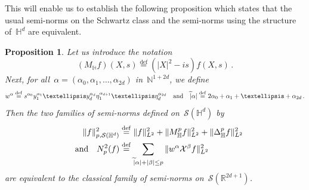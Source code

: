 \documentclass[11pt]{article}
\newtheorem{prop}[theo]{Proposition}
\theoremstyle{definition}
\numberwithin{equation}{section}
\numberwithin{figure}{section}
\numberwithin{table}{section}
\newcommand{\D}{\Delta}
\newcommand{\wt}{\widetilde}
\newcommand*\cS{\mathcal{S}}
\newcommand*\cX{\mathcal{X}}
\newcommand*\N{\mathbb{N}}
\newcommand*\R{\mathbb{R}}
\newcommand*\bbH{\mathbb{H}}
\newcommand{\andf}{\quad\hbox{and}\quad}
\newcommand*\eqdefa{\overset{\mathrm{def}}{=}}
\begin{document}
This will enable us to establish the following proposition which states that the usual semi-norms on the Schwartz class and the semi-norms using the structure of~$\bbH^d$ are equivalent.

\begin{prop}\label{p:schwartz}
Let us introduce the notation
\[
(M_\bbH f) (X,s) \eqdefa (|X|^2- is) f(X,s)\,.
\]
Next, for all~$\alpha =(\alpha_0, \alpha_1, \dots, \alpha_{2d})$ in~$\N^{1+2d}$, we define
\[
w^\alpha \eqdefa s^{\alpha_0} y_1^{\alpha_1} \dots y_d^{\alpha_d} \eta_1^{\alpha_{d+1}} \dots \eta_d^{\alpha_{2d}}
\andf \wt |\alpha|\eqdefa 2\alpha_0+\alpha_1+\dots +\alpha_{2d}\,.
\]
Then the two families of semi-norms defined on~$\cS(\bbH^d)$ by
\[
\begin{aligned}
\|f\|^2_{p,\cS(\bbH^d)} & \eqdefa \|f\|_{L^2} ^2+ \|M_\bbH^pf\|_{L^2}^2 +\| \D_\bbH^p f \|^2_{L^2} \\ \andf
N_p^2(f) & \eqdefa \sum_{\wt |\alpha|+|\beta| \leq p }\| w^\alpha \cX^\beta f\|^2_{L^2}
\end{aligned}
\]
are equivalent to the classical family of semi-norms on~$\cS(\R^{2d+1})$.
\end{prop}
\end{document}
